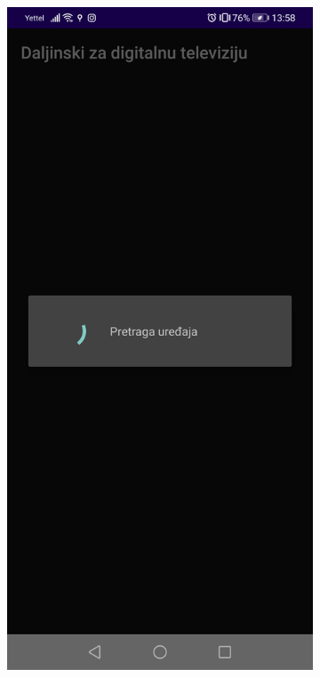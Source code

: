 \documentclass[implementacija.tex]{subfiles}
\begin{document}

\begin{figure}
    \centering
    \begin{subfigure}[b]{0.3\textwidth}
        \centering
        \includegraphics[width=\textwidth,keepaspectratio]{Implementacija/snimci_ekrana/3_pretraga_uredjaja.jpg}

\end{subfigure}
\end{figure}
\end{document}

